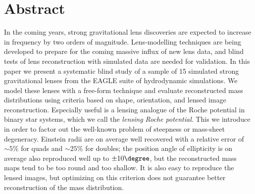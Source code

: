 
\clearpage

\section*{Abstract}
  \noindent In the coming years, strong gravitational lens discoveries are
  expected to increase in frequency by two orders of magnitude.  Lens-modelling
  techniques are being developed to prepare for the coming massive influx of new
  lens data, and blind tests of lens reconstruction with simulated data are
  needed for validation.  In this paper we present a systematic blind study of a
  sample of 15 simulated strong gravitational lenses from the EAGLE suite of
  hydrodynamic simulations.  We model these lenses with a free-form technique
  and evaluate reconstructed mass distributions using criteria based on shape,
  orientation, and lensed image reconstruction.  Especially useful is a lensing
  analogue of the Roche potential in binary star systems, which we call the {\em
  lensing Roche potential}.  This we introduce in order to factor out the
  well-known problem of steepness or mass-sheet degeneracy.  Einstein radii are
  on average well recovered with a relative error of ${\sim}5\%$ for quads and
  ${\sim}25\%$ for doubles; the position angle of ellipticity is on average also
  reproduced well up to $\pm10\degree$, but the reconstructed mass maps tend to
  be too round and too shallow.  It is also easy to reproduce the lensed images,
  but optimizing on this criterion does not guarantee better reconstruction of
  the mass distribution.


\clearpage



